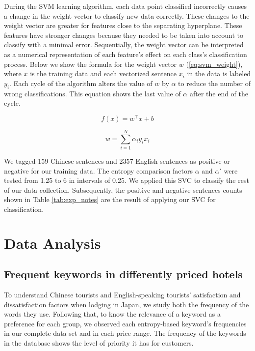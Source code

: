 \documentclass[smallextended,natbib]{svjour3}       %
\begin{document}
    During the SVM learning algorithm, each data point classified incorrectly causes a change in the weight vector to classify new data correctly. These changes to the weight vector are greater for features close to the separating hyperplane. These features have stronger changes because they needed to be taken into account to classify with a minimal error. Sequentially, the weight vector can be interpreted as a numerical representation of each feature's effect on each class's classification process. Below we show the formula for the weight vector \(w\) (\ref{eq:svm_weight}), where \(x\) is the training data and each vectorized sentence \(x_i\) in the data is labeled \(y_i\). Each cycle of the algorithm alters the value of \(w\) by \(\alpha\) to reduce the number of wrong classifications. This equation shows the last value of \(\alpha\) after the end of the cycle.

    \begin{equation}\label{eq:svm1}
    f(x) = w^\top x + b
    \end{equation}

    \begin{equation}\label{eq:svm_weight}
    w = \sum_{i=1}^N \alpha_i y_i x_i
    \end{equation}

    We tagged 159 Chinese sentences and \num[group-separator={,}]{2357} English sentences as positive or negative for our training data. The entropy comparison factors \(\alpha\) and \(\alpha'\) were tested from 1.25 to 6 in intervals of 0.25. We applied this SVC to classify the rest of our data collection. Subsequently, the positive and negative sentences counts shown in Table \ref{tab:exp_notes} are the result of applying our SVC for classification.

\section{Data Analysis}\label{dataanalysis}

  \subsection{Frequent keywords in differently priced hotels}\label{svmresults}

    To understand Chinese tourists and English-speaking tourists' satisfaction and dissatisfaction factors when lodging in Japan, we study both the frequency of the words they use. Following that, to know the relevance of a keyword as a preference for each group, we observed each entropy-based keyword's frequencies in our complete data set and in each price range. The frequency of the keywords in the database shows the level of priority it has for customers.
\end{document}
